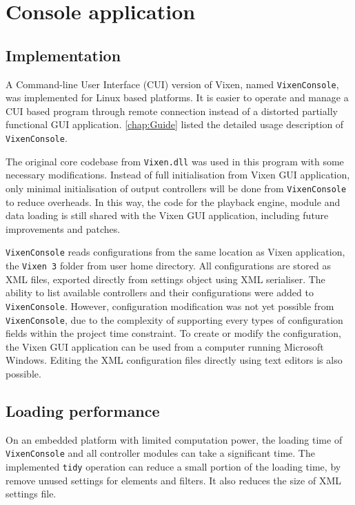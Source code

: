 \chapter{Console application}
\renewcommand{\baselinestretch}{\mystretch}
\label{chap:Console}

\section{Implementation}

A Command-line User Interface (CUI) version of Vixen, named \texttt{VixenConsole}, was implemented for Linux based platforms. It is easier to operate and manage a CUI based program through remote connection instead of a distorted partially functional GUI application. \cref{chap:Guide} listed the detailed usage description of \texttt{VixenConsole}.

The original core codebase from \texttt{Vixen.dll} was used in this program with some necessary modifications. Instead of full initialisation from Vixen GUI application, only minimal initialisation of output controllers will be done from \texttt{VixenConsole} to reduce overheads. In this way, the code for the playback engine, module and data loading is still shared with the Vixen GUI application, including future improvements and patches.

\texttt{VixenConsole} reads configurations from the same location as Vixen application, the \texttt{Vixen 3} folder from user home directory. All configurations are stored as XML files, exported directly from settings object using XML serialiser. The ability to list available controllers and their configurations were added to \texttt{VixenConsole}. However, configuration modification was not yet possible from \texttt{VixenConsole}, due to the complexity of supporting every types of configuration fields within the project time constraint. To create or modify the configuration, the Vixen GUI application can be used from a computer running Microsoft Windows. Editing the XML configuration files directly using text editors is also possible.

\section{Loading performance}

On an embedded platform with limited computation power, the loading time of \texttt{VixenConsole} and all controller modules can take a significant time. The implemented \texttt{tidy} operation can reduce a small portion of the loading time, by remove unused settings for elements and filters. It also reduces the size of XML settings file.

